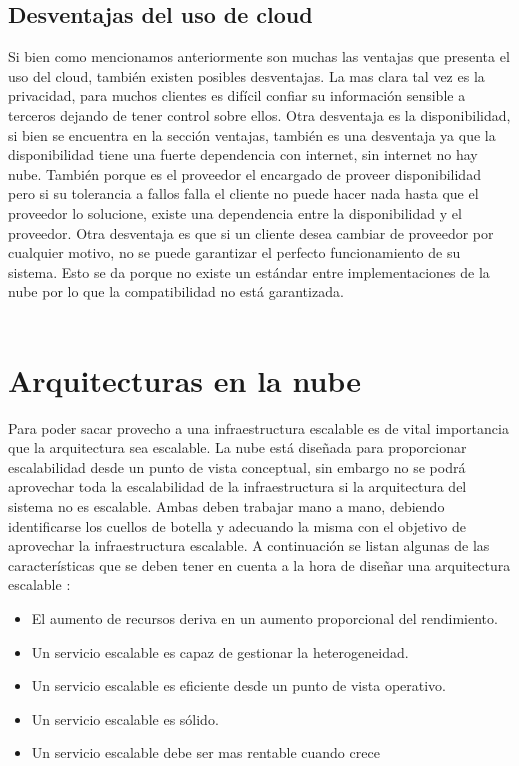     \subsection {Desventajas del uso de cloud}
    Si bien como mencionamos anteriormente son muchas las ventajas que presenta el uso del cloud, también existen posibles desventajas. 
    La mas clara tal vez es la privacidad, para muchos clientes es difícil confiar su información sensible a terceros dejando de tener control sobre ellos. 
    Otra desventaja es la disponibilidad, si bien se encuentra en la sección ventajas, también es una desventaja ya que la disponibilidad tiene una fuerte dependencia con internet, sin internet no hay nube. También porque es el proveedor el encargado de proveer disponibilidad pero si su tolerancia a fallos falla el cliente no puede hacer nada hasta que el proveedor lo solucione, existe una dependencia entre la disponibilidad y el proveedor. 
    Otra desventaja es que si un cliente desea cambiar de proveedor por cualquier motivo, no se puede garantizar el perfecto funcionamiento de su sistema. Esto se da porque no existe un estándar entre implementaciones de la nube por lo que la compatibilidad no está garantizada.
  \\
  \\
 \section{Arquitecturas en la nube}
 Para poder sacar provecho a una infraestructura escalable es de vital importancia que la arquitectura sea escalable. La nube está diseñada para proporcionar escalabilidad desde un punto de vista conceptual, sin embargo no se podrá aprovechar toda la escalabilidad de la infraestructura si la arquitectura del sistema no es escalable. Ambas deben trabajar mano a mano, debiendo identificarse los cuellos de botella y adecuando la misma con el objetivo de aprovechar la infraestructura escalable. A continuación se listan algunas de las características que se deben tener en cuenta a la hora de diseñar una arquitectura escalable : 
 
 \begin{itemize}
 \item El aumento de recursos deriva en un aumento proporcional del rendimiento.
 \item Un servicio escalable es capaz de gestionar la heterogeneidad.
 \item Un servicio escalable es eficiente desde un punto de vista operativo.
 \item Un servicio escalable es sólido.
 \item Un servicio escalable debe ser mas rentable cuando crece
 \end {itemize}
 
